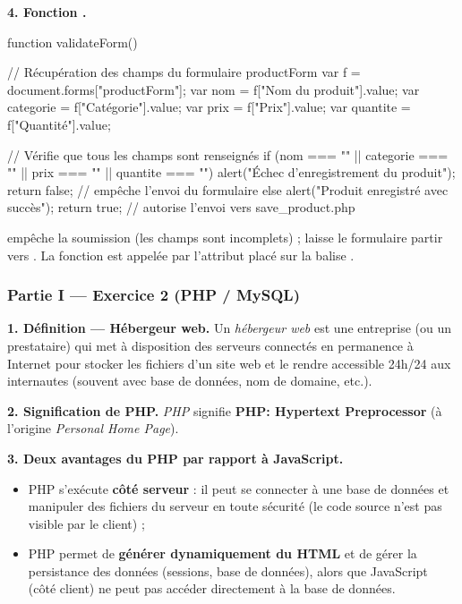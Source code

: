 \medskip
\textbf{4. Fonction .}

\begin{codejs}
function validateForm() {
  // Récupération des champs du formulaire productForm
  var f = document.forms["productForm"];
  var nom       = f["Nom du produit"].value;
  var categorie = f["Catégorie"].value;
  var prix      = f["Prix"].value;
  var quantite  = f["Quantité"].value;

  // Vérifie que tous les champs sont renseignés
  if (nom === "" || categorie === "" || prix === "" || quantite === "") {
    alert("Échec d'enregistrement du produit");
    return false;   // empêche l'envoi du formulaire
  } else {
    alert("Produit enregistré avec succès");
    return true;    // autorise l'envoi vers save_product.php
  }
}
\end{codejs}

\begin{remarque}
 empêche la soumission (les champs sont incomplets) ; 
laisse le formulaire partir vers . La fonction est appelée par
l'attribut  placé sur la balise .
\end{remarque}

\subsubsection*{Partie I — Exercice 2 (PHP / MySQL)}

\textbf{1. Définition — Hébergeur web.} Un \emph{hébergeur web} est une entreprise (ou un
prestataire) qui met à disposition des serveurs connectés en permanence à Internet pour
stocker les fichiers d'un site web et le rendre accessible 24h/24 aux internautes (souvent
avec base de données, nom de domaine, etc.).

\medskip
\textbf{2. Signification de PHP.} \emph{PHP} signifie \textbf{PHP: Hypertext Preprocessor}
(à l'origine \emph{Personal Home Page}).

\medskip
\textbf{3. Deux avantages du PHP par rapport à JavaScript.}
\begin{itemize}
  \item PHP s'exécute \textbf{côté serveur} : il peut se connecter à une base de données et
  manipuler des fichiers du serveur en toute sécurité (le code source n'est pas visible par
  le client) ;
  \item PHP permet de \textbf{générer dynamiquement du HTML} et de gérer la persistance des
  données (sessions, base de données), alors que JavaScript (côté client) ne peut pas
  accéder directement à la base de données.
\end{itemize}

